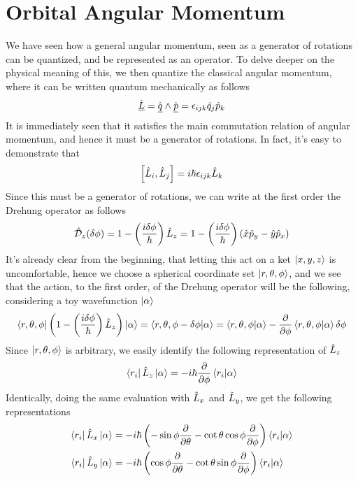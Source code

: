\documentclass[../qm.tex]{subfiles}
\begin{document}
	\section{Orbital Angular Momentum}
	We have seen how a general angular momentum, seen as a generator of rotations can be quantized, and be represented as an operator. To delve deeper on the physical meaning of this, we then quantize the classical angular momentum, where it can be written quantum mechanically as follows
	\begin{equation}
		\hat{\underline{L}}=\hat{\underline{q}}\wedge\hat{\underline{p}}=\epsilon_{ijk}\hat{q}_j\hat{p}_k
		\label{eq:orbangmom}
	\end{equation}
	It is immediately seen that it satisfies the main commutation relation of angular momentum, and hence it must be a generator of rotations. In fact, it's easy to demonstrate that
	\begin{equation}
		\comm{\opr{L}_i}{\opr{L}_j}=i\hbar\lc{ijk}\opr{L}_k
		\label{eq:commrelorbangmom}
	\end{equation}
	Since this must be a generator of rotations, we can write at the first order the Drehung operator as follows
	\begin{equation}
		\hat{\mathcal{D}}_z(\delta\phi)=1-\left( \frac{i\delta\phi}{\hbar} \right)\hat{L}_z=1-\left( \frac{i\delta\phi}{\hbar} \right)(\hat{x}\hat{p}_y-\hat{y}\hat{p}_x)
		\label{eq:drehungoplz}
	\end{equation}
	It's already clear from the beginning, that letting this act on a ket $\ket{x,y,z}$ is uncomfortable, hence we choose a spherical coordinate set $\ket{r,\theta,\phi}$, and we see that the action, to the first order, of the Drehung operator will be the following, considering a toy wavefunction $\ket{\alpha}$
	\begin{equation}
		\bra{r,\theta,\phi}\left( 1-\left( \frac{i\delta\phi}{\hbar} \right)\hat{L}_z \right)\ket{\alpha}=\bra{r,\theta,\phi-\delta\phi}\ket{\alpha}=\bra{r,\theta,\phi}\ket{\alpha}-\pdv{\phi}\bra{r,\theta,\phi}\ket{\alpha}\delta\phi
		\label{eq:actionlz}
	\end{equation}
	Since $\ket{r,\theta,\phi}$ is arbitrary, we easily identify the following representation of $\hat{L}_z$
	\begin{equation}
		\bra{r_i}\hat{L}_z\ket{\alpha}=-i\hbar\pdv{\phi}\bra{r_i}\ket{\alpha}
		\label{eq:lzrepresentation}
	\end{equation}
	Identically, doing the same evaluation with $\hat{L}_x$ and $\hat{L}_y$, we get the following representations
	\begin{equation}
		\begin{aligned}
			\bra{r_i}\hat{L}_x\ket{\alpha}&=-i\hbar\left( -\sin\phi\pdv{\theta}-\cot\theta\cos\phi\pdv{\phi} \right)\bra{r_i}\ket{\alpha}\\
			\bra{r_i}\hat{L}_y\ket{\alpha}&=-i\hbar\left( \cos\phi\pdv{\theta}-\cot\theta\sin\phi\pdv{\phi} \right)\bra{r_i}\ket{\alpha}
		\end{aligned}
		\label{eq:lxlyrep}
	\end{equation}
\end{document}
